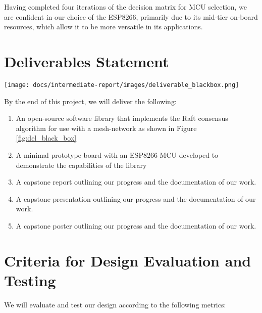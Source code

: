 \documentclass[compsoc]{IEEEtran}
\begin{document}
Having completed four iterations of the decision matrix for MCU selection, we are confident in our choice of the ESP8266, primarily due to its mid-tier on-board resources, which allow it to be more versatile in its applications.


\newpage
\section{Deliverables Statement}

\begingroup
    \centering
    \medskip
    \texttt{[image: docs/intermediate-report/images/deliverable\_blackbox.png]}
    \label{fig:del_black_box}
    \medskip
\endgroup

By the end of this project, we will deliver the following: 

\begin{enumerate}
  \item An open-source software library that implements the Raft consensus algorithm for use with a mesh-network as shown in Figure \ref{fig:del_black_box}
  \item A minimal prototype board with an ESP8266 MCU developed to demonstrate the capabilities of the library 
  \item A capstone report outlining our progress and the documentation of our work.
  \item A capstone presentation outlining our progress and the documentation of our work.
  \item A capstone poster outlining our progress and the documentation of our work.

\end{enumerate}


\section{Criteria for Design Evaluation and Testing}
We will evaluate and test our design according to the following metrics:
\end{document}

